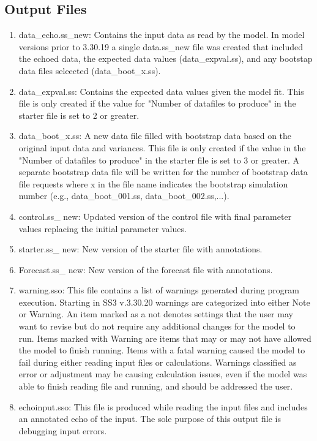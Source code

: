 	\subsection[Output Files]{Output Files \protect\hyperlink{output-files}{\faExternalLink}}
	\begin{enumerate}
		\item data\_echo.ss\_new: Contains the input data as read by the model. In model versions prior to 3.30.19 a single data.ss\_new file was created that included the echoed data, the expected data values (data\_expval.ss), and any bootstap data files seleected (data\_boot\_x.ss).
		\item data\_expval.ss: Contains the expected data values given the model fit. This file is only created if the value for "Number of datafiles to produce" in the starter file is set to 2 or greater.
		\item data\_boot\_x.ss: A new data file filled with bootstrap data based on the original input data and variances. This file is only created if the value in the "Number of datafiles to produce" in the starter file is set to 3 or greater. A separate bootstrap data file will be written for the number of bootstrap data file requests where x in the file name indicates the bootstrap simulation number (e.g., data\_boot\_001.ss, data\_boot\_002.ss,...).
		\item control.ss\_ new: Updated version of the control file with final parameter values replacing the initial parameter values.
		\item starter.ss\_ new: New version of the starter file with annotations.
		\item Forecast.ss\_ new: New version of the forecast file with annotations.
		\item warning.sso: This file contains a list of warnings generated during program execution. Starting in SS3 v.3.30.20 warnings are categorized into either Note or Warning. An item marked as a not denotes settings that the user may want to revise but do not require any additional changes for the model to run. Items marked with Warning are items that may or may not have allowed the model to finish running. Items with a fatal warning caused the model to fail during either reading input files or calculations. Warnings classified as error or adjustment may be causing calculation issues, even if the model was able to finish reading file and running, and should be addressed the user. 
		\item echoinput.sso: This file is produced while reading the input files and includes an annotated echo of the input. The sole purpose of this output file is debugging input errors.

\end{enumerate}

